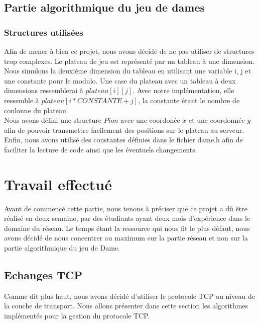 \documentclass{article}
\begin{document}
    \subsection{Partie algorithmique du jeu de dames}
    \subsubsection{Structures utilisées}
        Afin de mener à bien ce projet, nous avons décidé de ne pas utiliser de structures trop complexes. Le plateau de jeu est représenté
        par un tableau à une dimension. Nous simulons la deuxième dimension du tableau en utilisant une variable i, j et une constante pour
        le modulo. Une case du plateau avec un tableau à deux dimensions ressemblerai à $plateau[i][j]$. Avec notre implémentation, elle
        ressemble à $plateau[i*CONSTANTE + j]$, la constante étant le nombre de conlonne du plateau.\\
        Nous avons défini une structure $Pion$ avec une coordonée $x$ et une coordonnée $y$ afin de pouvoir transmettre facilement des
        positions sur le plateau au serveur.
        Enfin, nous avons utilisé des constantes définies dans le fichier dame.h afin de faciliter la lecture de code ainsi que les éventuels
        changements.

        \begin{changemargin}{-1cm}{-1cm}
            
        \end{changemargin}

    \section{Travail effectué}
        Avant de commencé cette partie, nous tenons à préciser que ce projet a dû être réalisé en deux semaine, par des étudiants
        ayant deux mois d'expérience dans le domaine du réseau. Le temps étant la ressource qui nous fit le plus défaut, nous avons
        décidé de nous concentrer au maximum sur la partie réseau et non sur la partie algorithmique du jeu de Dame.
    \subsection{Echanges TCP}
        Comme dit plus haut, nous avons décidé d'utiliser le protocole TCP au niveau de la couche de transport. Nous allons présenter
        dans cette section les algorithmes implémentés pour la gestion du protocole TCP.
\end{document}
